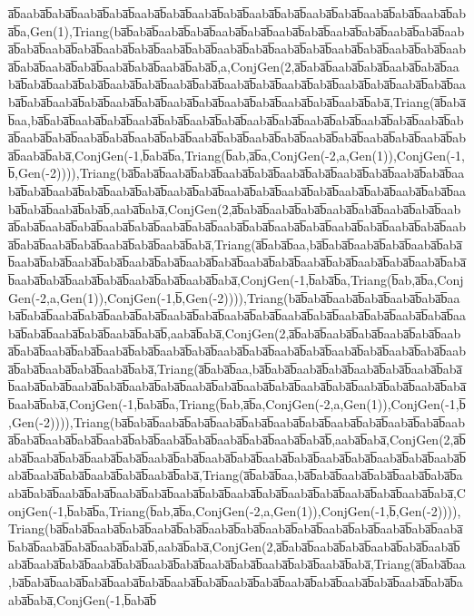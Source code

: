 a̅b̅aaba̅b̅aba̅b̅aaba̅b̅aba̅b̅aaba̅b̅aba̅b̅aaba̅b̅aba̅b̅aaba̅b̅aba̅b̅aaba̅b̅aba̅b̅aaba̅b̅aba̅b̅aaba̅b̅aba̅b̅a,Gen(1),Triang(ba̅b̅aba̅b̅aaba̅b̅aba̅b̅aaba̅b̅aba̅b̅aaba̅b̅aba̅b̅aaba̅b̅aba̅b̅aaba̅b̅aba̅b̅aaba̅b̅aba̅b̅aaba̅b̅aba̅b̅aaba̅b̅aba̅b̅aaba̅b̅aba̅b̅aaba̅b̅aba̅b̅aaba̅b̅aba̅b̅aaba̅b̅aba̅b̅aaba̅b̅aba̅b̅aaba̅b̅aba̅b̅aaba̅b̅aba̅b̅aaba̅b̅aba̅b̅aaba̅b̅aba̅b̅,a,ConjGen(2,a̅b̅aba̅b̅aaba̅b̅aba̅b̅aaba̅b̅aba̅b̅aaba̅b̅aba̅b̅aaba̅b̅aba̅b̅aaba̅b̅aba̅b̅aaba̅b̅aba̅b̅aaba̅b̅aba̅b̅aaba̅b̅aba̅b̅aaba̅b̅aba̅b̅aaba̅b̅aba̅b̅aaba̅b̅aba̅b̅aaba̅b̅aba̅b̅aaba̅b̅aba̅b̅aaba̅b̅aba̅b̅aaba̅b̅aba̅b̅aaba̅b̅aba̅b̅aaba̅b̅aba̅,Triang(a̅b̅aba̅b̅aa,ba̅b̅aba̅b̅aaba̅b̅aba̅b̅aaba̅b̅aba̅b̅aaba̅b̅aba̅b̅aaba̅b̅aba̅b̅aaba̅b̅aba̅b̅aaba̅b̅aba̅b̅aaba̅b̅aba̅b̅aaba̅b̅aba̅b̅aaba̅b̅aba̅b̅aaba̅b̅aba̅b̅aaba̅b̅aba̅b̅aaba̅b̅aba̅b̅aaba̅b̅aba̅b̅aaba̅b̅aba̅b̅aaba̅b̅aba̅b̅aaba̅b̅aba̅,ConjGen(-1,b̅aba̅b̅a,Triang(b̅ab,a̅b̅a,ConjGen(-2,a,Gen(1)),ConjGen(-1,b̅,Gen(-2)))),Triang(ba̅b̅aba̅b̅aaba̅b̅aba̅b̅aaba̅b̅aba̅b̅aaba̅b̅aba̅b̅aaba̅b̅aba̅b̅aaba̅b̅aba̅b̅aaba̅b̅aba̅b̅aaba̅b̅aba̅b̅aaba̅b̅aba̅b̅aaba̅b̅aba̅b̅aaba̅b̅aba̅b̅aaba̅b̅aba̅b̅aaba̅b̅aba̅b̅aaba̅b̅aba̅b̅aaba̅b̅aba̅b̅aaba̅b̅aba̅b̅,aaba̅b̅aba̅,ConjGen(2,a̅b̅aba̅b̅aaba̅b̅aba̅b̅aaba̅b̅aba̅b̅aaba̅b̅aba̅b̅aaba̅b̅aba̅b̅aaba̅b̅aba̅b̅aaba̅b̅aba̅b̅aaba̅b̅aba̅b̅aaba̅b̅aba̅b̅aaba̅b̅aba̅b̅aaba̅b̅aba̅b̅aaba̅b̅aba̅b̅aaba̅b̅aba̅b̅aaba̅b̅aba̅b̅aaba̅b̅aba̅b̅aaba̅b̅aba̅,Triang(a̅b̅aba̅b̅aa,ba̅b̅aba̅b̅aaba̅b̅aba̅b̅aaba̅b̅aba̅b̅aaba̅b̅aba̅b̅aaba̅b̅aba̅b̅aaba̅b̅aba̅b̅aaba̅b̅aba̅b̅aaba̅b̅aba̅b̅aaba̅b̅aba̅b̅aaba̅b̅aba̅b̅aaba̅b̅aba̅b̅aaba̅b̅aba̅b̅aaba̅b̅aba̅b̅aaba̅b̅aba̅b̅aaba̅b̅aba̅,ConjGen(-1,b̅aba̅b̅a,Triang(b̅ab,a̅b̅a,ConjGen(-2,a,Gen(1)),ConjGen(-1,b̅,Gen(-2)))),Triang(ba̅b̅aba̅b̅aaba̅b̅aba̅b̅aaba̅b̅aba̅b̅aaba̅b̅aba̅b̅aaba̅b̅aba̅b̅aaba̅b̅aba̅b̅aaba̅b̅aba̅b̅aaba̅b̅aba̅b̅aaba̅b̅aba̅b̅aaba̅b̅aba̅b̅aaba̅b̅aba̅b̅aaba̅b̅aba̅b̅aaba̅b̅aba̅b̅aaba̅b̅aba̅b̅,aaba̅b̅aba̅,ConjGen(2,a̅b̅aba̅b̅aaba̅b̅aba̅b̅aaba̅b̅aba̅b̅aaba̅b̅aba̅b̅aaba̅b̅aba̅b̅aaba̅b̅aba̅b̅aaba̅b̅aba̅b̅aaba̅b̅aba̅b̅aaba̅b̅aba̅b̅aaba̅b̅aba̅b̅aaba̅b̅aba̅b̅aaba̅b̅aba̅b̅aaba̅b̅aba̅b̅aaba̅b̅aba̅,Triang(a̅b̅aba̅b̅aa,ba̅b̅aba̅b̅aaba̅b̅aba̅b̅aaba̅b̅aba̅b̅aaba̅b̅aba̅b̅aaba̅b̅aba̅b̅aaba̅b̅aba̅b̅aaba̅b̅aba̅b̅aaba̅b̅aba̅b̅aaba̅b̅aba̅b̅aaba̅b̅aba̅b̅aaba̅b̅aba̅b̅aaba̅b̅aba̅b̅aaba̅b̅aba̅,ConjGen(-1,b̅aba̅b̅a,Triang(b̅ab,a̅b̅a,ConjGen(-2,a,Gen(1)),ConjGen(-1,b̅,Gen(-2)))),Triang(ba̅b̅aba̅b̅aaba̅b̅aba̅b̅aaba̅b̅aba̅b̅aaba̅b̅aba̅b̅aaba̅b̅aba̅b̅aaba̅b̅aba̅b̅aaba̅b̅aba̅b̅aaba̅b̅aba̅b̅aaba̅b̅aba̅b̅aaba̅b̅aba̅b̅aaba̅b̅aba̅b̅aaba̅b̅aba̅b̅,aaba̅b̅aba̅,ConjGen(2,a̅b̅aba̅b̅aaba̅b̅aba̅b̅aaba̅b̅aba̅b̅aaba̅b̅aba̅b̅aaba̅b̅aba̅b̅aaba̅b̅aba̅b̅aaba̅b̅aba̅b̅aaba̅b̅aba̅b̅aaba̅b̅aba̅b̅aaba̅b̅aba̅b̅aaba̅b̅aba̅b̅aaba̅b̅aba̅,Triang(a̅b̅aba̅b̅aa,ba̅b̅aba̅b̅aaba̅b̅aba̅b̅aaba̅b̅aba̅b̅aaba̅b̅aba̅b̅aaba̅b̅aba̅b̅aaba̅b̅aba̅b̅aaba̅b̅aba̅b̅aaba̅b̅aba̅b̅aaba̅b̅aba̅b̅aaba̅b̅aba̅b̅aaba̅b̅aba̅,ConjGen(-1,b̅aba̅b̅a,Triang(b̅ab,a̅b̅a,ConjGen(-2,a,Gen(1)),ConjGen(-1,b̅,Gen(-2)))),Triang(ba̅b̅aba̅b̅aaba̅b̅aba̅b̅aaba̅b̅aba̅b̅aaba̅b̅aba̅b̅aaba̅b̅aba̅b̅aaba̅b̅aba̅b̅aaba̅b̅aba̅b̅aaba̅b̅aba̅b̅aaba̅b̅aba̅b̅aaba̅b̅aba̅b̅,aaba̅b̅aba̅,ConjGen(2,a̅b̅aba̅b̅aaba̅b̅aba̅b̅aaba̅b̅aba̅b̅aaba̅b̅aba̅b̅aaba̅b̅aba̅b̅aaba̅b̅aba̅b̅aaba̅b̅aba̅b̅aaba̅b̅aba̅b̅aaba̅b̅aba̅b̅aaba̅b̅aba̅,Triang(a̅b̅aba̅b̅aa,ba̅b̅aba̅b̅aaba̅b̅aba̅b̅aaba̅b̅aba̅b̅aaba̅b̅aba̅b̅aaba̅b̅aba̅b̅aaba̅b̅aba̅b̅aaba̅b̅aba̅b̅aaba̅b̅aba̅b̅aaba̅b̅aba̅,ConjGen(-1,b̅aba̅b̅